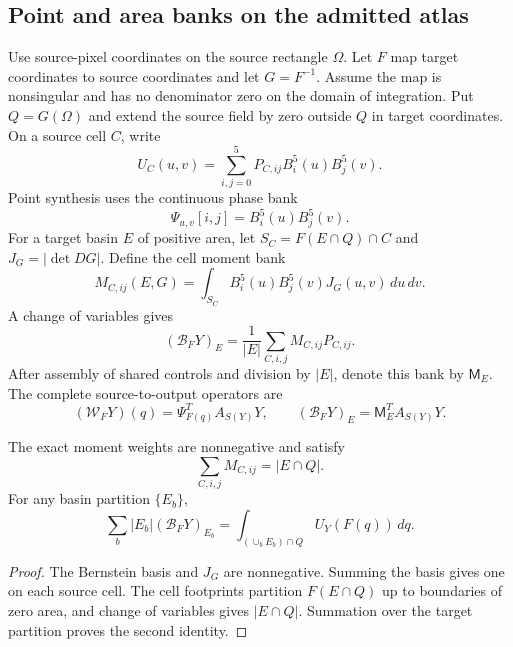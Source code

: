 \subsection{Point and area banks on the admitted atlas}
Use source-pixel coordinates on the source rectangle $\Omega$. Let
$F$ map target coordinates to source coordinates and let $G=F^{-1}$.
Assume the map is nonsingular and has no denominator zero on the domain of
integration. Put $Q=G(\Omega)$ and extend the source field by zero outside
$Q$ in target coordinates. On a source cell $C$, write
\begin{equation}
 U_C(u,v)=\sum_{i,j=0}^5P_{C,ij}B_i^5(u)B_j^5(v).
\end{equation}
Point synthesis uses the continuous phase bank
\begin{equation}
 \Psi_{u,v}[i,j]=B_i^5(u)B_j^5(v).
 \label{eq:starphasebank}
\end{equation}
For a target basin $E$ of positive area, let
$S_C=F(E\cap Q)\cap C$ and $J_G=|\det DG|$. Define the cell moment bank
\begin{equation}
 M_{C,ij}(E,G)=\int_{S_C}B_i^5(u)B_j^5(v)J_G(u,v)\,du\,dv.
 \label{eq:starmomentbank}
\end{equation}
A change of variables gives
\begin{equation}
 (\mathcal B_FY)_E=\frac1{|E|}\sum_{C,i,j}M_{C,ij}P_{C,ij}.
 \label{eq:starareabank}
\end{equation}
After assembly of shared controls and division by $|E|$, denote this bank
by $\mathsf M_E$. The complete source-to-output operators are
\begin{equation}
 (\mathcal W_FY)(q)=\Psi_{F(q)}^TA_{S(Y)}Y,\qquad
 (\mathcal B_FY)_E=\mathsf M_E^TA_{S(Y)}Y.
\end{equation}

\begin{proposition}
The exact moment weights are nonnegative and satisfy
\begin{equation}
 \sum_{C,i,j}M_{C,ij}=|E\cap Q|.
\end{equation}
For any basin partition $\{E_b\}$,
\begin{equation}
 \sum_b|E_b|(\mathcal B_FY)_{E_b}
 =\int_{(\cup_bE_b)\cap Q}U_Y(F(q))\,dq.
\end{equation}
\end{proposition}
\begin{proof}
The Bernstein basis and $J_G$ are nonnegative. Summing the basis gives one
on each source cell. The cell footprints partition $F(E\cap Q)$ up to
boundaries of zero area, and change of variables gives $|E\cap Q|$.
Summation over the target partition proves the second identity.
\end{proof}

